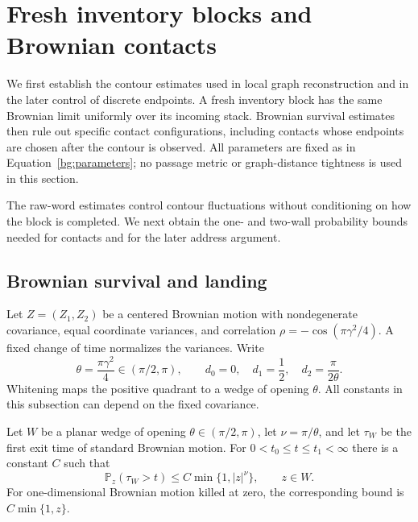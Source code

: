 \section{Fresh inventory blocks and Brownian contacts}
\label{arm:inputs}

We first establish the contour estimates used in local graph reconstruction
and in the later control of discrete endpoints.  A fresh inventory block
has the same Brownian limit uniformly over its incoming stack.  Brownian
survival estimates then rule out specific contact configurations, including
contacts whose endpoints are chosen after the contour is observed.
All parameters are fixed as in Equation~\eqref{bg:parameters}; no passage
metric or graph-distance tightness is used in this section.



The raw-word estimates control contour fluctuations without conditioning
on how the block is completed.  We next obtain the one- and two-wall
probability bounds needed for contacts and for the later address argument.

\subsection{Brownian survival and landing}

Let $Z=(Z_1,Z_2)$ be a centered Brownian motion with nondegenerate
covariance, equal coordinate variances, and correlation
$\rho=-\cos(\pi\gamma^2/4)$.  A fixed change of time normalizes the
variances.  Write
\[
 \theta=\frac{\pi\gamma^2}{4}\in(\pi/2,\pi),\qquad
 d_0=0,\quad d_1=\frac12,\quad d_2=\frac{\pi}{2\theta}.
\]
Whitening maps the positive quadrant to a wedge of opening $\theta$.
All constants in this subsection can depend on the fixed covariance.

\begin{lemma}\label{arm:wedge-survival}
Let $W$ be a planar wedge of opening $\theta\in(\pi/2,\pi)$, let
$\nu=\pi/\theta$, and let $\tau_W$ be the first exit time of standard
Brownian motion.  For $0<t_0\le t\le t_1<\infty$ there is a constant
$C$ such that
\[
 \mathbb P_z(\tau_W>t)\le C\min\{1,|z|^\nu\},\qquad z\in W.
\]
For one-dimensional Brownian motion killed at zero, the corresponding
bound is $C\min\{1,z\}$.
\end{lemma}

